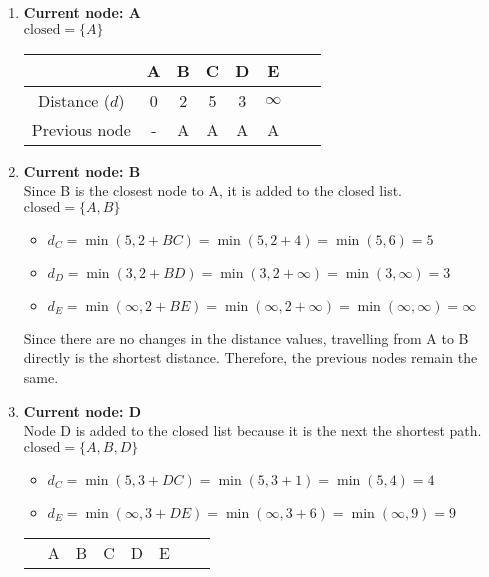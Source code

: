 \begin{enumerate}
    \item \textbf{Current node: A}\\
          $\text{closed} = \{A\}$\\
          \def\arraystretch{1.5}
          \begin{tabular}{ |c|c|c|c|c|c|c|c| }
              \hline
                             & A & B & C & D & E        \\
              \hline
              Distance ($d$) & 0 & 2 & 5 & 3 & $\infty$ \\
              \hline
              Previous node  & - & A & A & A & A        \\
              \hline
          \end{tabular}
    \item \textbf{Current node: B}\\
          Since B is the closest node to A, it is added to the closed list.\\
          $\text{closed} = \{A,B\}$
          \begin{itemize}
              \item $d_C=\min(5,2+BC)=\min(5,2+4)=\min(5,6)=5$
              \item $d_D=\min(3,2+BD)=\min(3,2+\infty)=\min(3,\infty)=3$
              \item $d_E=\min(\infty,2+BE)=\min(\infty,2+\infty)=\min(\infty,\infty)=\infty$
          \end{itemize}
          Since there are no changes in the distance values, travelling from A to B directly is the shortest distance. Therefore, the previous nodes remain the same.
    \item \textbf{Current node: D}\\
          Node D is added to the closed list because it is the next the shortest path.\\
          $\text{closed} = \{A,B,D\}$
          \begin{itemize}
              \item $d_C=\min(5,3+DC)=\min(5,3+1)=\min(5,4)=4$
              \item $d_E=\min(\infty,3+DE)=\min(\infty,3+6)=\min(\infty,9)=9$
          \end{itemize}
          \def\arraystretch{1.5}
          \begin{tabular}{ |c|c|c|c|c|c|c|c| }
              \hline
                             & A & B & C & D & E \\

\end{tabular}
\end{enumerate}
